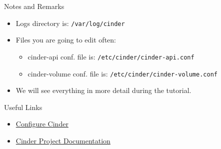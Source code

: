 \documentclass[english,serif,mathserif]{beamer}
\begin{document}
\begin{frame}{Notes and Remarks}

\begin{itemize}
\item Logs directory is: \texttt{/var/log/cinder}
\item Files you are going to edit often:
      \begin{itemize}
        \item cinder-api conf. file is: \texttt{/etc/cinder/cinder-api.conf}
        \item cinder-volume conf. file is: \texttt{/etc/cinder/cinder-volume.conf}
      \end{itemize}
\item We will see everything in more detail during the tutorial.
\end{itemize}

\end{frame}

\begin{frame}{Useful Links}

\begin{itemize}
\item {\color{blue}\href{http://docs.openstack.org/icehouse/install-guide/install/apt/content/ch\_cinder.html}{Configure Cinder}}
\item {\color{blue}\href{https://wiki.openstack.org/wiki/Cinder}{Cinder Project Documentation}}
\end{itemize}

\end{frame}
\end{document}
